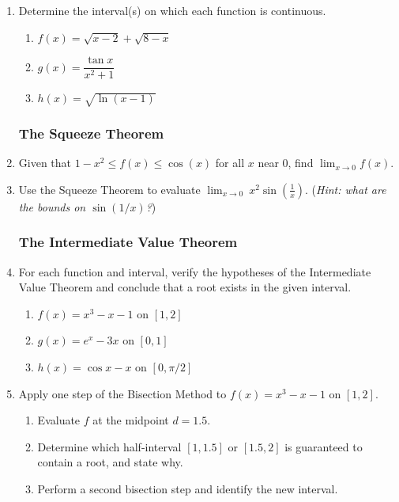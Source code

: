 \begin{enumerate}
\item Determine the interval(s) on which each function is
      continuous.
      \begin{enumerate}
        \item $f(x) = \sqrt{x - 2} + \sqrt{8 - x}$
        \item $g(x) = \dfrac{\tan x}{x^2 + 1}$
        \item $h(x) = \sqrt{\ln(x - 1)}$
      \end{enumerate}

\subsubsection*{The Squeeze Theorem}

\item Given that $1 - x^2 \leq f(x) \leq \cos(x)$ for all $x$
      near $0$, find $\displaystyle\lim_{x \to 0} f(x)$.

\item Use the Squeeze Theorem to evaluate
      $\displaystyle\lim_{x \to 0}\ x^2 \sin\!\left(\frac{1}{x}\right)$.
      (\textit{Hint: what are the bounds on $\sin(1/x)$?})

\subsubsection*{The Intermediate Value Theorem}

\item For each function and interval, verify the hypotheses of the
      Intermediate Value Theorem and conclude that a root exists
      in the given interval.
      \begin{enumerate}
        \item $f(x) = x^3 - x - 1$ on $[1, 2]$
        \item $g(x) = e^x - 3x$ on $[0, 1]$
        \item $h(x) = \cos x - x$ on $[0, \pi/2]$
      \end{enumerate}

\item Apply one step of the Bisection Method to
      $f(x) = x^3 - x - 1$ on $[1, 2]$.
      \begin{enumerate}
        \item Evaluate $f$ at the midpoint $d = 1.5$.
        \item Determine which half-interval $[1, 1.5]$ or
              $[1.5, 2]$ is guaranteed to contain a root, and
              state why.
        \item Perform a second bisection step and identify the
              new interval.
      \end{enumerate}


\end{enumerate}

